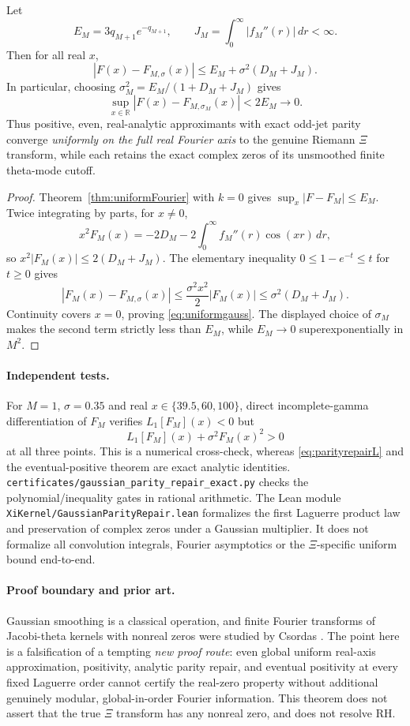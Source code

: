 \begin{theorem}
\label{thm:parityuniform}
Let
\[
E_M=3q_{M+1}e^{-q_{M+1}},\qquad
J_M=\int_0^\infty|f_M''(r)|\,dr<\infty.
\]
Then for all real $x$,
\begin{equation}
\boxed{
|F(x)-F_{M,\sigma}(x)|
\le E_M+\sigma^2(D_M+J_M).
}
\label{eq:uniformgauss}
\end{equation}
In particular, choosing
$\sigma_M^2=E_M/(1+D_M+J_M)$ gives
\[
\sup_{x\in\mathbb R}
|F(x)-F_{M,\sigma_M}(x)|<2E_M
\longrightarrow0.
\]
Thus positive, even, real-analytic
approximants with exact odd-jet parity
converge \emph{uniformly on the full real
Fourier axis} to the genuine Riemann
$\Xi$ transform, while each retains
the exact complex zeros of its
unsmoothed finite theta-mode cutoff.
\end{theorem}
\begin{proof}
Theorem~\ref{thm:uniformFourier} with
$k=0$ gives
$\sup_x|F-F_M|\le E_M$.
Twice integrating by parts, for $x\ne0$,
\[
x^2F_M(x)
=-2D_M-2\int_0^\infty
f_M''(r)\cos(xr)\,dr,
\]
so $x^2|F_M(x)|\le2(D_M+J_M)$.
The elementary inequality
$0\le1-e^{-t}\le t$ for $t\ge0$ gives
\[
|F_M(x)-F_{M,\sigma}(x)|
\le\frac{\sigma^2x^2}{2}|F_M(x)|
\le\sigma^2(D_M+J_M).
\]
Continuity covers $x=0$, proving
\eqref{eq:uniformgauss}.
The displayed choice of $\sigma_M$
makes the second term strictly
less than $E_M$, while $E_M\to0$
superexponentially in $M^2$.
\end{proof}

\paragraph{Independent tests.}
For $M=1$, $\sigma=0.35$ and real
$x\in\{39.5,60,100\}$, direct
incomplete-gamma differentiation
of $F_M$ verifies
$L_1[F_M](x)<0$ but
\[
L_1[F_M](x)+\sigma^2F_M(x)^2>0
\]
at all three points. This is a
numerical cross-check, whereas
\eqref{eq:parityrepairL} and the
eventual-positive theorem are exact
analytic identities.
\texttt{certificates/gaussian\_parity\_repair\_exact.py}
checks the polynomial/inequality
gates in rational arithmetic.
The Lean module
\texttt{XiKernel/GaussianParityRepair.lean}
formalizes the first Laguerre
product law and preservation of
complex zeros under a Gaussian
multiplier. It does not formalize
all convolution integrals,
Fourier asymptotics or the
$\Xi$-specific uniform bound
end-to-end.

\paragraph{Proof boundary and prior art.}
Gaussian smoothing is a classical
operation, and finite Fourier
transforms of Jacobi-theta kernels
with nonreal zeros were studied
by Csordas \cite{CsTrunc}.
The point here is a falsification
of a tempting \emph{new proof route}:
even global uniform real-axis
approximation, positivity,
analytic parity repair, and
eventual positivity at every
fixed Laguerre order cannot
certify the real-zero property
without additional genuinely
modular, global-in-order
Fourier information.
This theorem does not assert
that the true $\Xi$ transform
has any nonreal zero, and
does not resolve RH.
